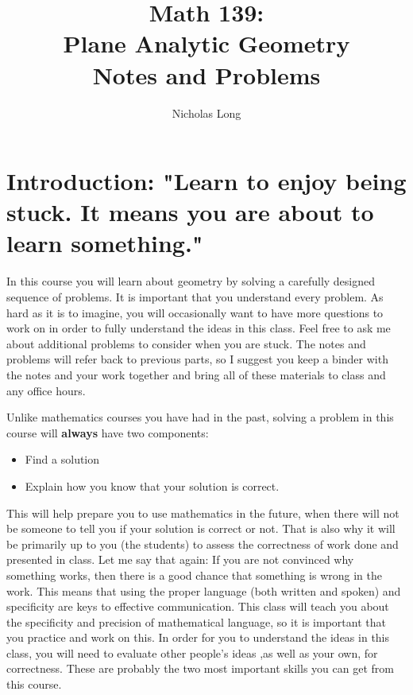 


%
\InstructorVersion
%

\newcommand\bq{\begin{question}}
\newcommand\eq{\end{question}}
\newcommand\be{\begin{enumerate}}
\newcommand\ee{\end{enumerate}}
\renewcommand{\labelenumi}{\alph{enumi})}



\large
\frontmatter
\title{Math 139: \\ Plane Analytic Geometry \\ Notes and Problems}
\author{Nicholas Long}
\maketitle

\chapter{Introduction: "Learn to enjoy being stuck. It means you are about to learn something."}


In this course you will learn about geometry by solving a carefully designed sequence of problems.  It is important that you understand every problem. As hard as it is to imagine, you will occasionally want to have more questions to work on in order to fully understand the ideas in this class. Feel free to ask me about additional problems to consider when you are stuck. The notes and problems will refer back to previous parts, so I suggest you keep a binder with the notes and your work together and bring all of these materials to class and any office hours.

Unlike mathematics courses you have had in the past, solving a problem in this course will \textbf{always} have two components:
\begin{itemize}
\item Find a solution
\item Explain how you know that your solution is correct.
\end{itemize}
This will help prepare you to use mathematics in the future, when there will not be someone to tell you if your solution is correct or not. That is also why it will be primarily up to you (the students) to assess the correctness of work done and presented in class. Let me say that again: If you are not convinced why something works, then there is a good chance that something is wrong in the work. This means that using the proper language (both written and spoken) and specificity are keys to effective communication. This class will teach you about the specificity and precision of mathematical language, so it is important that you practice and work on this. In order for you to understand the ideas in this class, you will need to evaluate other people's ideas ,as well as your own, for correctness. These are probably the two most important skills you can get from this course.

